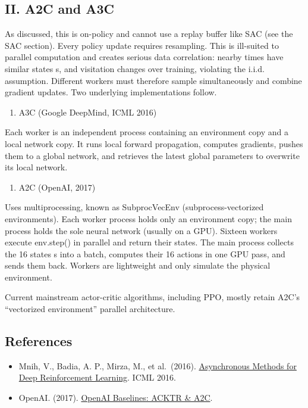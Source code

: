 \hypertarget{ii.-a2c-and-a3c}{%
\subsection{II. A2C and A3C}\label{ii.-a2c-and-a3c}}

As discussed, this is on-policy and cannot use a replay buffer like SAC (see the SAC section). Every policy update requires resampling. This is ill-suited to parallel computation and creates serious data correlation: nearby times have similar states s, and visitation changes over training, violating the i.i.d. assumption. Different workers must therefore sample simultaneously and combine gradient updates. Two underlying implementations follow.

\begin{enumerate}
\def\labelenumi{\arabic{enumi}.}
\tightlist
\item
  A3C (Google DeepMind, ICML 2016)
\end{enumerate}

Each worker is an independent process containing an environment copy and a local network copy. It runs local forward propagation, computes gradients, pushes them to a global network, and retrieves the latest global parameters to overwrite its local network.

\begin{enumerate}
\def\labelenumi{\arabic{enumi}.}
\setcounter{enumi}{1}
\tightlist
\item
  A2C (OpenAI, 2017)
\end{enumerate}

Uses multiprocessing, known as SubprocVecEnv (subprocess-vectorized environments). Each worker process holds only an environment copy; the main process holds the sole neural network (usually on a GPU). Sixteen workers execute env.step() in parallel and return their states. The main process collects the 16 states s into a batch, computes their 16 actions in one GPU pass, and sends them back. Workers are lightweight and only simulate the physical environment.

Current mainstream actor-critic algorithms, including PPO, mostly retain A2C's ``vectorized environment'' parallel architecture.

\FloatBarrier
{}
\hypertarget{references-56}{%
\subsection{References}\label{references-56}}

\vspace{0.25em}
\begin{itemize}
\tightlist
\item
  Mnih, V., Badia, A. P., Mirza, M., et al.~(2016). \href{https://arxiv.org/abs/1602.01783}{Asynchronous Methods for Deep Reinforcement Learning}. ICML 2016.
\item
  OpenAI. (2017). \href{https://openai.com/index/openai-baselines-acktr-a2c/}{OpenAI Baselines: ACKTR \& A2C}.
\end{itemize}

\clearpage
